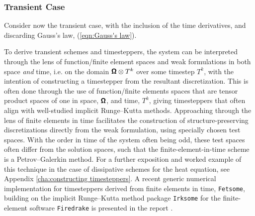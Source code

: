 \subsubsection*{Transient Case}

    Consider now the transient case, with the inclusion of the time derivatives, and discarding Gauss's law, (\ref{eqn:Gauss's law}).
    
     To derive transient schemes and timesteppers, the system can be interpreted through the lens of function/finite element spaces and weak formulations in both space \emph{and} time, i.e. on the domain $\pmb{\mathsf{\Omega}}\otimes T^{k}$ over some timestep $T^{k}$, with the intention of constructing a timestepper from the resultant discretization. This is often done through the use of function/finite elements spaces that are tensor product spaces of one in space, $\pmb{\mathsf{\Omega}}$, and time, $T^{k}$, giving timesteppers that often align with well-studied implicit Runge–Kutta methods. Approaching through the lens of finite elements in time facilitates the construction of structure-preserving discretizations directly from the weak formulation, using specially chosen test spaces. With the order in time of the system often being odd, these test spaces often differ from the solution spaces, such that the finite-element-in-time scheme is a Petrov–Galerkin method. For a further exposition and worked example of this technique in the case of dissipative schemes for the heat equation, see Appendix \ref{cha:constructing timesteppers}. A recent generic numerical implementation for timesteppers derived from finite elements in time, {\tt Fetsome}, building on the implicit Runge–Kutta method package {\tt Irksome} for the finite-element software {\tt Firedrake} is presented in the report \cite{La22}.

